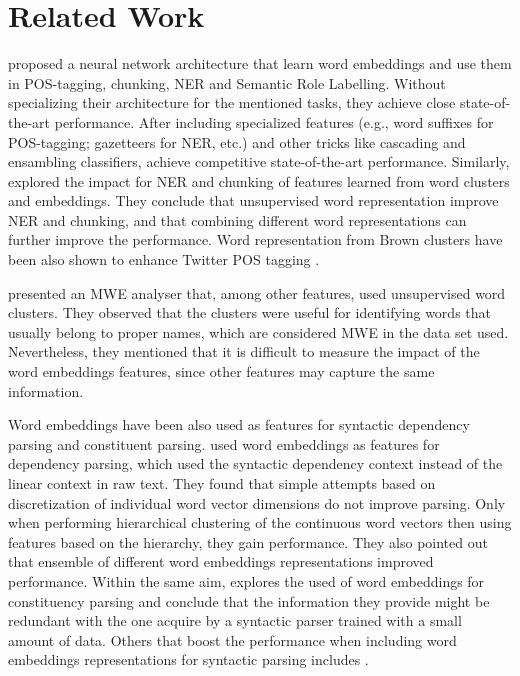 \section{Related Work}

 proposed a neural network architecture
that learn word embeddings and use them in POS-tagging, chunking, NER and Semantic Role Labelling. 
Without specializing their architecture for the mentioned tasks, they achieve close state-of-the-art performance. After including specialized features (e.g., word suffixes for POS-tagging;  gazetteers for NER, etc.) and other tricks like cascading and ensambling classifiers, achieve competitive state-of-the-art performance.
Similarly,  explored the impact for NER and chunking 
of %
features learned from word clusters and embeddings. 
They conclude that unsupervised word representation improve NER and chunking, and that combining different word representations can further improve the performance.
Word representation from Brown clusters have been also shown to enhance
Twitter POS tagging . 

 presented an MWE analyser that, among other features, used unsupervised word clusters. 
They observed that the clusters were useful for identifying words that usually belong to proper names, which are considered MWE in the data set used. Nevertheless, they mentioned that it is difficult to measure the impact of the word embeddings features, since other features may capture the same information. 

Word embeddings have been also used as features for syntactic dependency parsing and constituent parsing. 
 used word embeddings as features for dependency parsing, which used the syntactic dependency context instead of the linear context in raw text. They found that simple attempts based on discretization of individual word vector dimensions do not improve parsing. Only when performing hierarchical clustering of the continuous word vectors then using features based on the hierarchy, they gain performance. They also pointed out that ensemble of different word embeddings representations improved performance.
Within the same aim,  explores the used of word embeddings for constituency parsing and conclude that the
information they provide might be redundant with the one acquire by a syntactic parser trained with a small amount of data. Others that boost the performance when including word embeddings representations for syntactic parsing includes \cite{Koo:2008,Koo:2010,Haffari:2011,Tratz:2011}.

